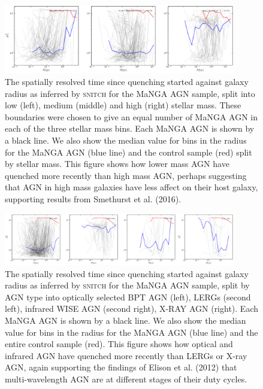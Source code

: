 \documentclass[useAMS,usenatbib]{mn2e}
\begin{document}
\begin{figure}
\includegraphics[width=0.9\textwidth]{../data/ellison/figures/median_deltatq_with_kpc_radius_ellison_splitmass.png}
\caption{The spatially resolved time since quenching started against galaxy radius as inferred by \textsc{snitch} for the MaNGA AGN sample, split into low (left), medium (middle) and high (right) stellar mass. These boundaries were chosen to give an equal number of MaNGA AGN in each of the three stellar mass bins. Each MaNGA AGN is shown by a black line. We also show the median value for bins in the radius for the MaNGA AGN (blue line) and the control sample (red) split by stellar mass. This figure shows how lower mass AGN have quenched more recently than high mass AGN, perhaps suggesting that AGN in high mass galaxies have less affect on their host galaxy, supporting results from Smethurst et al. (2016).}
\end{figure}

\begin{figure}
\includegraphics[width=0.9\textwidth]{../data/ellison/figures/median_deltatq_with_kpc_radius_ellison_splitagntype.png}
\caption{The spatially resolved time since quenching started against galaxy radius as inferred by \textsc{snitch} for the MaNGA AGN sample, split by AGN type into optically selected BPT AGN (left), LERGs (second left), infrared WISE AGN (second right), X-RAY AGN (right). Each MaNGA AGN is shown by a black line. We also show the median value for bins in the radius for the MaNGA AGN (blue line) and the entire control sample (red). This figure shows how optical and infrared AGN have quenched more recently than LERGs or X-ray AGN, again supporting the findings of Elison et al. (2012) that multi-wavelength AGN are at different stages of their duty cycles.}
\end{figure}
\end{document}
